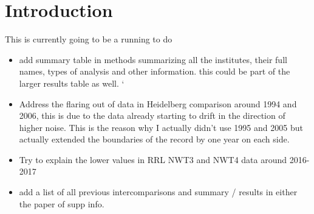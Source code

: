 \newpage
\section{Introduction}
This is currently going to be a running to do 
\begin{itemize}
	\item add summary table in methods summarizing all the institutes, their full names, types of analysis and other information. this could be part of the larger results table as well. `
	\item Address the flaring out of data in Heidelberg comparison around 1994 and 2006, this is due to the data already starting to drift in the direction of higher noise. This is the reason why I actually didn't use 1995 and 2005 but actually extended the boundaries of the record by one year on each side. 
	\item Try to explain the lower values in RRL NWT3 and NWT4 data around 2016-2017
	\item add a list of all previous intercomparisons and summary / results in either the paper of supp info. 
\end{itemize}